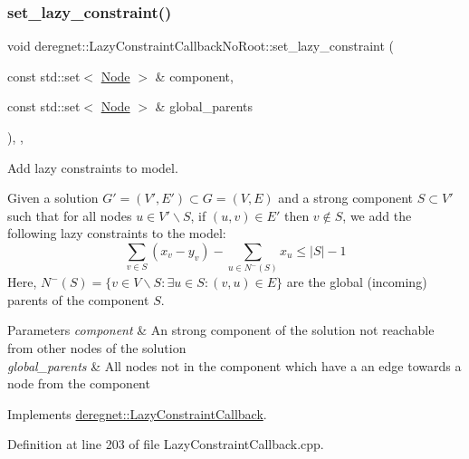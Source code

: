 \subsubsection{\texorpdfstring{set\+\_\+lazy\+\_\+constraint()}{set\_lazy\_constraint()}}
{\footnotesize\ttfamily void deregnet\+::\+Lazy\+Constraint\+Callback\+No\+Root\+::set\+\_\+lazy\+\_\+constraint (\begin{DoxyParamCaption}\item[{const std\+::set$<$ \hyperlink{namespacederegnet_a744bad34f2de9856d36715a445f027f3}{Node} $>$ \&}]{component,  }\item[{const std\+::set$<$ \hyperlink{namespacederegnet_a744bad34f2de9856d36715a445f027f3}{Node} $>$ \&}]{global\+\_\+parents }\end{DoxyParamCaption})\hspace{0.3cm}{\ttfamily [override]}, {\ttfamily [private]}, {\ttfamily [virtual]}}



Add lazy constraints to model. 

Given a solution $G'=(V',E') \subset G=(V,E)$ and a strong component $S \subset V'$ such that for all nodes $u \in V' \backslash S $, if $(u,v) \in E'$ then $v \notin S$, we add the following lazy constraints to the model\+: \[ \begin{equation} \displaystyle \sum_{v \in S} (x_v - y_v) - \displaystyle \sum_{u \in N^{-}(S)} x_u \leq |S| - 1 \end{equation} \] Here, $N^{-}(S) = \{v \in V \backslash S: \exists u \in S: (v,u) \in E \} $ are the global (incoming) parents of the component $S$.


\begin{DoxyParams}{Parameters}
{\em component} & An strong component of the solution not reachable from other nodes of the solution \\
\hline
{\em global\+\_\+parents} & All nodes not in the component which have a an edge towards a node from the component \\
\hline
\end{DoxyParams}


Implements \hyperlink{classderegnet_1_1LazyConstraintCallback_a8f6db7da84271afcd2e2169318569558}{deregnet\+::\+Lazy\+Constraint\+Callback}.



Definition at line 203 of file Lazy\+Constraint\+Callback.\+cpp.


